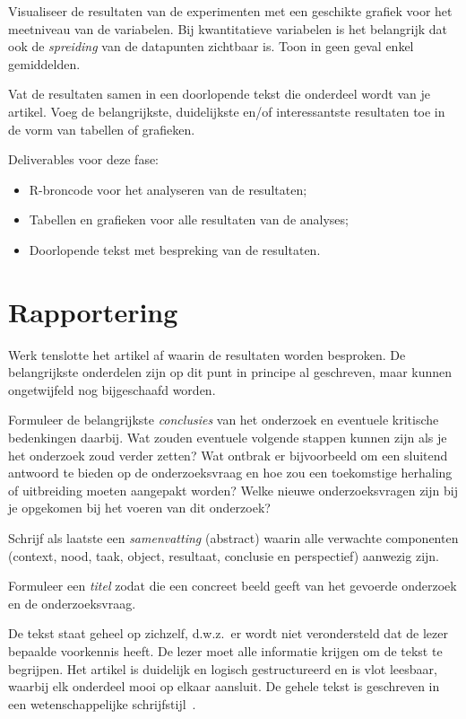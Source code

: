 \documentclass[fleqn,10pt]{voorstel}
\begin{document}
Visualiseer de resultaten van de experimenten met een geschikte grafiek voor het meetniveau van de variabelen. Bij kwantitatieve variabelen is het belangrijk dat ook de \emph{spreiding} van de datapunten zichtbaar is. Toon in geen geval enkel gemiddelden.

Vat de resultaten samen in een doorlopende tekst die onderdeel wordt van je artikel. Voeg de belangrijkste, duidelijkste en/of interessantste resultaten toe in de vorm van tabellen of grafieken.

Deliverables voor deze fase:

\begin{itemize}
  \item R-broncode voor het analyseren van de resultaten;
  \item Tabellen en grafieken voor alle resultaten van de analyses;
  \item Doorlopende tekst met bespreking van de resultaten.
\end{itemize}

\section{Rapportering}

Werk tenslotte het artikel af waarin de resultaten worden besproken. De belangrijkste onderdelen zijn op dit punt in principe al geschreven, maar kunnen ongetwijfeld nog bijgeschaafd worden.

Formuleer de belangrijkste \emph{conclusies} van het onderzoek en eventuele kritische bedenkingen daarbij. Wat zouden eventuele volgende stappen kunnen zijn als je het onderzoek zoud verder zetten? Wat ontbrak er bijvoorbeeld om een sluitend antwoord te bieden op de onderzoeksvraag en hoe zou een toekomstige herhaling of uitbreiding moeten aangepakt worden? Welke nieuwe onderzoeksvragen zijn bij je opgekomen bij het voeren van dit onderzoek?

Schrijf als laatste een \emph{samenvatting} (abstract) waarin alle verwachte componenten (context, nood, taak, object, resultaat, conclusie en perspectief) aanwezig zijn.

Formuleer een \emph{titel} zodat die een concreet beeld geeft van het gevoerde onderzoek en de onderzoeksvraag.

De tekst staat geheel op zichzelf, d.w.z.~er wordt niet verondersteld dat de lezer bepaalde voorkennis heeft. De lezer moet alle informatie krijgen om de tekst te begrijpen. Het artikel is duidelijk en logisch gestructureerd en is vlot leesbaar, waarbij elk onderdeel mooi op elkaar aansluit. De gehele tekst is geschreven in een wetenschappelijke schrijfstijl~\autocite{Taalwinkel2014}.
\end{document}
